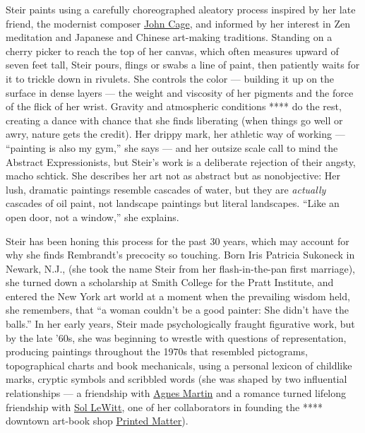 Steir paints using a carefully choreographed aleatory process inspired
by her late friend, the modernist composer
\href{https://www.nytimes.com/topic/person/john-cage}{John Cage}, and
informed by her interest in Zen meditation and Japanese and Chinese
art-making traditions. Standing on a cherry picker to reach the top of
her canvas, which often measures upward of seven feet tall, Steir pours,
flings or swabs a line of paint, then patiently waits for it to trickle
down in rivulets. She controls the color --- building it up on the
surface in dense layers --- the weight and viscosity of her pigments and
the force of the flick of her wrist. Gravity and atmospheric conditions
**** do the rest, creating a dance with chance that she finds liberating
(when things go well or awry, nature gets the credit). Her drippy mark,
her athletic way of working --- ``painting is also my gym,'' she says
--- and her outsize scale call to mind the Abstract Expressionists, but
Steir's work is a deliberate rejection of their angsty, macho schtick.
She describes her art not as abstract but as nonobjective: Her lush,
dramatic paintings resemble cascades of water, but they are
\emph{actually} cascades of oil paint, not landscape paintings but
literal landscapes. ``Like an open door, not a window,'' she explains.

Steir has been honing this process for the past 30 years, which may
account for why she finds Rembrandt's precocity so touching. Born Iris
Patricia Sukoneck in Newark, N.J., (she took the name Steir from her
flash-in-the-pan first marriage), she turned down a scholarship at Smith
College for the Pratt Institute, and entered the New York art world at a
moment when the prevailing wisdom held, she remembers, that ``a woman
couldn't be a good painter: She didn't have the balls.'' In her early
years, Steir made psychologically fraught figurative work, but by the
late '60s, she was beginning to wrestle with questions of
representation, producing paintings throughout the 1970s that resembled
pictograms, topographical charts and book mechanicals, using a personal
lexicon of childlike marks, cryptic symbols and scribbled words (she was
shaped by two influential relationships --- a friendship with
\href{https://www.nytimes.com/2004/12/17/arts/design/agnes-martin-abstract-painter-dies-at-92.html}{Agnes
Martin} and a romance turned lifelong friendship with
\href{https://www.nytimes.com/2007/04/09/arts/design/09lewitt.html}{Sol
LeWitt}, one of her collaborators in founding the **** downtown art-book
shop \href{https://www.printedmatter.org/}{Printed Matter}).

